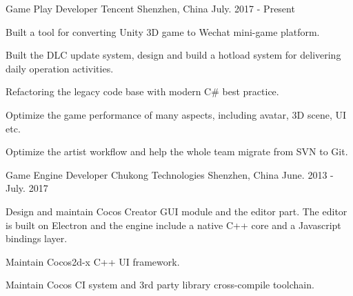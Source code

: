 

\begin{cventries}

  \cventry
    {Game Play Developer} %
    {Tencent} %
    {Shenzhen, China} %
    {July. 2017 - Present} %
    {
      \begin{cvitems} %
        \item {Built a tool for converting Unity 3D game to Wechat mini-game platform.}
        \item {Built the DLC update system, design and build a hotload system for delivering daily operation activities.}
        \item {Refactoring the legacy code base with modern C\# best practice.}
        \item {Optimize the game performance of many aspects, including avatar, 3D scene, UI etc.}
        \item {Optimize the artist workflow and help the whole team migrate from SVN to Git.}
      \end{cvitems}
    }

  \cventry
    {Game Engine Developer} %
    {Chukong Technologies} %
    {Shenzhen, China} %
    {June. 2013 - July. 2017} %
    {
      \begin{cvitems} %
        \item {Design and maintain Cocos Creator GUI module and the editor part. The editor is built on Electron and the engine include a native C++ core and a Javascript bindings layer.}
        \item {Maintain Cocos2d-x C++ UI framework.}
        \item {Maintain Cocos CI system and 3rd party library cross-compile toolchain.}
      \end{cvitems}
    }

\end{cventries}
